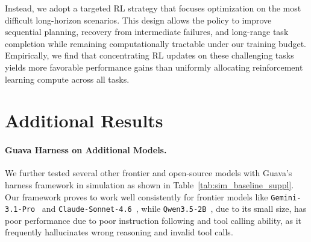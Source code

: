 Instead, we adopt a targeted RL strategy that focuses optimization on the most difficult long-horizon scenarios. This design allows the policy to improve sequential planning, recovery from intermediate failures, and long-range task completion while remaining computationally tractable under our training budget. Empirically, we find that concentrating RL updates on these challenging tasks yields more favorable performance gains than uniformly allocating reinforcement learning compute across all tasks.

\section{Additional Results}

\paragraph{Guava Harness on Additional Models.}
We further tested several other frontier and open-source models with Guava's harness framework in simulation as shown in Table~\ref{tab:sim_baseline_suppl}. Our framework proves to work well consistently for frontier models like \texttt{Gemini-3.1-Pro}~\citep{fu2026capxframeworkbenchmarkingimproving} and \texttt{Claude-Sonnet-4.6}~\citep{qwen2026qwen35}, while \texttt{Qwen3.5-2B}~\citep{openai2026gpt54}, due to its small size, has poor performance due to poor instruction following and tool calling ability, as it frequently hallucinates wrong reasoning and invalid tool calls.

